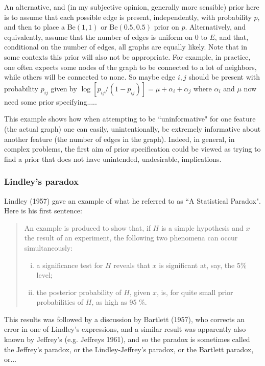 \documentclass[12pt]{article}
\begin{document}
An alternative, and (in my subjective opinion, generally more sensible) prior here is to assume that each possible edge is present, independently, with probability $p$, and then to place a Be$(1,1)$ or Be$(0.5,0.5)$ prior on $p$.  Alternatively, and equivalently,
assume that the number of edges is uniform on $0$ to $E$, and that, conditional on the number of edges, all graphs are equally likely. Note that in some contexts this prior will also not be appropriate. For example, in practice, one often expects some nodes of the graph to be connected to a lot of neighbors, while others will be connected to none. So maybe edge $i,j$ should be present with probability $p_{ij}$ given by $\log[p_{ij}/(1-p_{ij})] = \mu+\alpha_i + \alpha_j$ where
$\alpha_i$ and $\mu$ now need some prior specifying.....

This example shows how when attempting to be ``uninformative" for one feature (the actual graph)
one can easily, unintentionally, be extremely informative about another feature (the number of edges in the graph). Indeed, in general, in complex problems, the first aim of prior specification could be viewed as trying to find a prior that does not have unintended, undesirable, implications.

\subsubsection{Lindley's paradox}

Lindley (1957) gave an example of what he referred to 
as ``A Statistical Paradox". Here is his first sentence:

\begin{quote}
An example is produced to show that, if $H$ is a simple hypothesis and $x$ the result of an
experiment, the following two phenomena can occur simultaneously:
\begin{enumerate}[(i)]
\item a significance test for $H$ reveals that $x$ is significant at, say, the 5\% level;
\item the posterior probability of $H$, given $x$, is, for quite small prior probabilities of $H$, as high as 95 \%.
\end{enumerate}
\end{quote}

This results was followed by a discussion by Bartlett (1957), who corrects
an error in one of Lindley's expressions, 
and a similar result was apparently also known by Jeffrey's (e.g. Jeffreys 1961), and so the paradox 
is sometimes called the Jeffrey's paradox, or the Lindley-Jeffrey's paradox,
or the Bartlett paradox, or...
\end{document}
